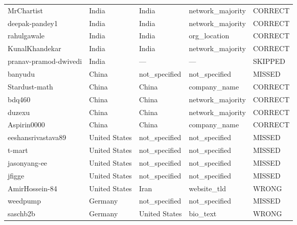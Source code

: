 \documentclass[11pt,a4paper]{article}
\begin{document}
\begin{longtable}{>{\ttfamily\small}p{4.4cm} p{3.0cm} p{3.0cm} p{2.6cm} p{1.6cm}}
\rowcolor{correct}  MrChartist                & India          & India          & network\_majority & CORRECT \\
\rowcolor{correct}  deepak-pandey1            & India          & India          & network\_majority & CORRECT \\
\rowcolor{correct}  rahulgawale               & India          & India          & org\_location    & CORRECT \\
\rowcolor{correct}  KunalKhandekar            & India          & India          & network\_majority & CORRECT \\
                    pranav-pramod-dwivedi     & India          & —              & —                & SKIPPED \\
\rowcolor{missed}   banyudu                   & China          & not\_specified & not\_specified   & MISSED  \\
\rowcolor{correct}  Stardust-math             & China          & China          & company\_name    & CORRECT \\
\rowcolor{correct}  bdq460                    & China          & China          & network\_majority & CORRECT \\
\rowcolor{correct}  duzexu                    & China          & China          & network\_majority & CORRECT \\
\rowcolor{correct}  Aspirin0000               & China          & China          & company\_name    & CORRECT \\
\rowcolor{missed}   eeshansrivastava89        & United States  & not\_specified & not\_specified   & MISSED  \\
\rowcolor{missed}   t-mart                    & United States  & not\_specified & not\_specified   & MISSED  \\
\rowcolor{missed}   jasonyang-ee              & United States  & not\_specified & not\_specified   & MISSED  \\
\rowcolor{missed}   jfigge                    & United States  & not\_specified & not\_specified   & MISSED  \\
\rowcolor{wrong}    AmirHossein-84            & United States  & Iran           & website\_tld     & WRONG   \\
\rowcolor{missed}   weedpump                  & Germany        & not\_specified & not\_specified   & MISSED  \\
\rowcolor{wrong}    saschb2b                  & Germany        & United States  & bio\_text        & WRONG   \\

\end{longtable}
\end{document}

